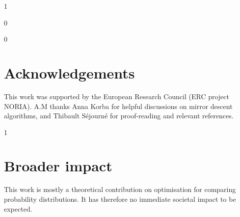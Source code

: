 \documentclass{article}
\def\icml{0}
\begin{document}
\if\icml1

\else

\fi

\begin{abstract}
  
\end{abstract}

\if\icml0
\medskip
\fi













\if\icml0
\section{Acknowledgements}
This work was supported by the European Research Council (ERC project NORIA). A.M thanks Anna Korba for helpful discussions on mirror descent algorithms, and Thibault Séjourné for proof-reading and relevant references.
\fi


\if\icml1
\section*{Broader impact}

This work is mostly a theoretical contribution on optimisation for comparing probability distributions. It has therefore no immediate societal impact to be expected.
\fi

\vfill


\printbibliography

\appendix

\onecolumn


\end{document}
